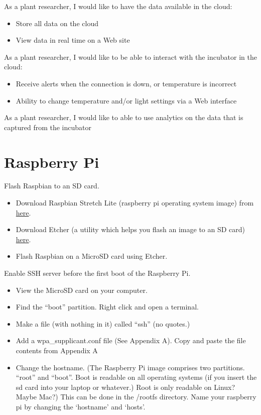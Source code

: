 \documentclass[]{book}
\begin{document}
As a plant researcher, I would like to have the data available in the cloud:

\begin{itemize}
\item
  Store all data on the cloud
\item
  View data in real time on a Web site
\end{itemize}

As a plant researcher, I would like to be able to interact with the incubator in the cloud:

\begin{itemize}
\item
  Receive alerts when the connection is down, or temperature is incorrect
\item
  Ability to change temperature and/or light settings via a Web interface
\end{itemize}

As a plant researcher, I would like to able to use analytics on the data that is captured from the incubator

\hypertarget{raspberry-pi}{%
\chapter{Raspberry Pi}\label{raspberry-pi}}

Flash Raspbian to an SD card.

\begin{itemize}
\item
  Download Raspbian Stretch Lite (raspberry pi operating system image) from \href{https://www.raspberrypi.org/downloads/raspbian/}{here}.
\item
  Download Etcher (a utility which helps you flash an image to an SD card) \href{https://www.balena.io/etcher/}{here}.
\item
  Flash Raspbian on a MicroSD card using Etcher.
\end{itemize}

Enable SSH server before the first boot of the Raspberry Pi.

\begin{itemize}
\item
  View the MicroSD card on your computer.
\item
  Find the ``boot'' partition. Right click and open a terminal.
\item
  Make a file (with nothing in it) called ``ssh'' (no quotes.)
\item
  Add a wpa\_supplicant.conf file (See Appendix A). Copy and paste the file contents from Appendix A
\item
  Change the hostname. (The Raspberry Pi image comprises two partitions. ``root'' and ``boot''. Boot is readable on all operating systems (if you insert the sd card into your laptop or whatever.) Root is only readable on Linux? Maybe Mac?) This can be done in the /rootfs directory. Name your raspberry pi by changing the `hostname' and `hosts'.
\end{itemize}
\end{document}
